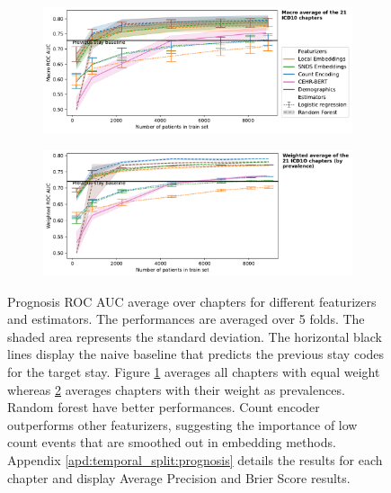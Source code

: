\documentclass[french,12pt,twoside,a4paper]{book}
\begin{document}
\begin{figure}[!h]
  \begin{subfigure}[b]{1\textwidth}
    \centering
    \caption{}\label{fig:prognosis_roc_auc_macro}
    \includegraphics[width=0.8\linewidth]{img/chapter_3/prognosis/roc_auc_score__c_macro.pdf}
  \end{subfigure}
  \vfill
  \begin{subfigure}[b]{1\textwidth}
    \centering
    \caption{}\label{fig:prognosis_roc_auc_weighted}
    \includegraphics[width=0.8\linewidth]{img/chapter_3/prognosis/roc_auc_score__c_weighted.pdf}
  \end{subfigure}
  \caption{Prognosis ROC AUC average over chapters for different featurizers and
    estimators. The performances are averaged over 5 folds. The shaded area
    represents the standard deviation. The horizontal black lines display the
    naive baseline that predicts the previous stay codes for the target stay.
    Figure \ref{fig:prognosis_roc_auc_macro} averages all chapters with equal
    weight whereas \ref{fig:prognosis_roc_auc_weighted} averages chapters with
    their weight as prevalences. Random forest have better performances. Count
    encoder outperforms other featurizers, suggesting the importance of low
    count events that are smoothed out in embedding methods. Appendix
    \ref{apd:temporal_split:prognosis} details the results for each chapter and
    display Average Precision and Brier Score results.}%
  \label{fig:prognosis_roc_auc}
\end{figure}
\end{document}

